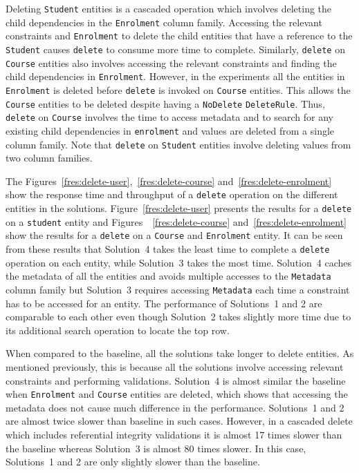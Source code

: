 Deleting \texttt{Student} entities is a cascaded operation which involves
deleting the child dependencies in the \texttt{Enrolment} column family.
Accessing the relevant constraints and  \texttt{Enrolment} to delete the child
entities that have a reference to the \texttt{Student} causes \texttt{delete} to
consume more time to complete. Similarly, \texttt{delete} on \texttt{Course}
entities also involves accessing the relevant constraints and finding the child
dependencies in \texttt{Enrolment}. However, in the experiments  all the
entities in \texttt{Enrolment} is deleted before \texttt{delete} is invoked on
\texttt{Course} entities. This allows the \texttt{Course} entities to be deleted
despite having a \texttt{NoDelete} \texttt{DeleteRule}. Thus, \texttt{delete} on
\texttt{Course} involves the time to access metadata and to search for any
existing child dependencies in \texttt{enrolment} and values are deleted from a
single column family. Note that \texttt{delete} on \texttt{Student} entities
involve deleting values from two column families.


The Figures~\ref{fres:delete-user},~\ref{fres:delete-course}
and~\ref{fres:delete-enrolment} show the response time and throughput of a
\texttt{delete} operation on the different entities in the solutions.
Figure~\ref{fres:delete-user} presents the results for a \texttt{delete} on a
\texttt{student} entity and Figures~~\ref{fres:delete-course}
and~\ref{fres:delete-enrolment} show the results for a \texttt{delete} on a
\texttt{Course} and \texttt{Enrolment} entity. It can be seen from these results
that Solution~4 takes the least time to complete a \texttt{delete} operation on
each entity, while Solution~3 takes the most time. Solution~4 caches the
metadata of all the entities and avoids multiple accesses to the
\texttt{Metadata} column family but Solution~3 requires accessing
\texttt{Metadata} each time a constraint has to be accessed for an entity. The
performance of Solutions~1 and 2 are comparable to each other even though
Solution~2 takes slightly more time due to its additional search operation to
locate the top row.

When compared to the baseline, all the solutions take longer to delete entities.
As mentioned previously, this is because all the solutions involve accessing
relevant constraints and performing validations. Solution~4 is almost similar
the baseline when \texttt{Enrolment} and \texttt{Course} entities are deleted,
which shows that accessing the metadata does not cause much difference in the
performance. Solutions~1 and 2 are almost twice slower than baseline in such
cases. However, in a cascaded delete which includes referential integrity
validations it is almost 17 times slower than the baseline whereas Solution~3 is
almost 80 times slower. In this case, Solutions~1 and 2 are only slightly slower
than the baseline.



